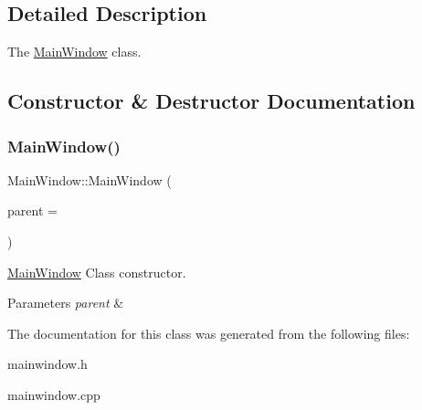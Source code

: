 \subsection{Detailed Description}
The \hyperlink{class_main_window}{Main\+Window} class. 

\subsection{Constructor \& Destructor Documentation}
\mbox{\label{class_main_window_a8b244be8b7b7db1b08de2a2acb9409db}} 
\subsubsection{\texorpdfstring{Main\+Window()}{MainWindow()}}
{\footnotesize\ttfamily Main\+Window\+::\+Main\+Window (\begin{DoxyParamCaption}\item[{Q\+Widget $\ast$}]{parent = {} }\end{DoxyParamCaption})\hspace{0.3cm}{\ttfamily [explicit]}}



\hyperlink{class_main_window}{Main\+Window} Class constructor. 


\begin{DoxyParams}{Parameters}
{\em parent} & \\
\hline
\end{DoxyParams}


The documentation for this class was generated from the following files\+:\begin{DoxyCompactItemize}
\item 
mainwindow.\+h\item 
mainwindow.\+cpp\end{DoxyCompactItemize}
